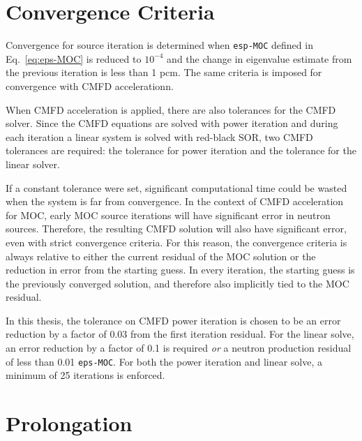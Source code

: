\section{Convergence Criteria}

Convergence for source iteration is determined when \texttt{esp-MOC} defined in Eq.~\ref{eq:eps-MOC} is reduced to $10^{-4}$ and the change in eigenvalue estimate from the previous iteration is less than 1 pcm. The same criteria is imposed for convergence with \ac{CMFD} accelerationn.

When \ac{CMFD} acceleration is applied, there are also tolerances for the \ac{CMFD} solver. Since the \ac{CMFD} equations are solved with power iteration and during each iteration a linear system is solved with red-black SOR, two \ac{CMFD} tolerances are required: the tolerance for power iteration and the tolerance for the linear solver.

If a constant tolerance were set, significant computational time could be wasted when the system is far from convergence. In the context of \ac{CMFD} acceleration for \ac{MOC}, early \ac{MOC} source iterations will have significant error in neutron sources. Therefore, the resulting \ac{CMFD} solution will also have significant error, even with strict convergence criteria. For this reason, the convergence criteria is always relative to either the current residual of the \ac{MOC} solution or the reduction in error from the starting guess. In every iteration, the starting guess is the previously converged solution, and therefore also implicitly tied to the \ac{MOC} residual.

In this thesis, the tolerance on \ac{CMFD} power iteration is chosen to be an error reduction by a factor of 0.03 from the first iteration residual. For the linear solve, an error reduction by a factor of 0.1 is required \textit{or} a neutron production residual of less than 0.01 \texttt{eps-MOC}. For both the power iteration and linear solve, a minimum of 25 iterations is enforced.

\section{Prolongation}

